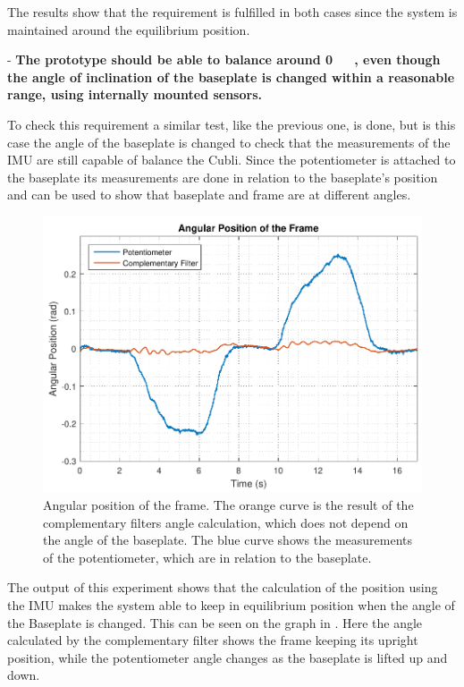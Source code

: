 The results show that the requirement is fulfilled in both cases since the system is maintained around the equilibrium position.

- \textbf{The prototype should be able to balance around \si{0\ \rad}, even though the angle of inclination of the baseplate is changed within a reasonable range, using internally mounted sensors.}

To check this requirement a similar test, like the previous one, is done, but is this case the angle of the baseplate is changed to check that the measurements of the IMU are still capable of balance the Cubli. Since the potentiometer is attached to the baseplate its measurements are done in relation to the baseplate's position and can be used to show that baseplate and frame are at different angles.

\begin{figure}[H]
	\centering
	\includegraphics[scale=0.62]{figures/testReq2}
	\caption{Angular position of the frame. The orange curve is the result of the complementary filters angle calculation, which does not depend on the angle of the baseplate. The blue curve shows the measurements of the potentiometer, which are in relation to the baseplate.}
	\label{testReq2}
\end{figure}\vspace{-5mm}
%
The output of this experiment shows that the calculation of the position using the IMU makes the system able to keep in equilibrium position when the angle of the Baseplate is changed. This can be seen on the graph in . Here the angle calculated by the complementary filter shows the frame keeping its upright position, while the potentiometer angle changes as the baseplate is lifted up and down. 

